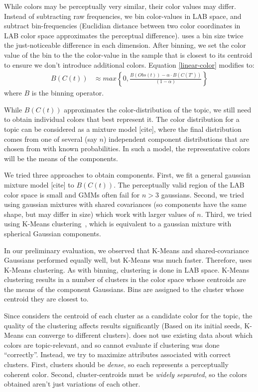 While colors may be perceptually very similar, their color values may differ. Instead of subtracting raw frequencies, we bin color-values in LAB space, and subtract bin-frequencies (Euclidian distance between two color coordinates in LAB color space approximates the perceptual difference). \system uses a bin size twice the just-noticeable difference in each dimension. After binning, we set the color value of the bin to the the color-value in the sample that is closest to its centroid to ensure we don't introduce additional colors. Equation \ref{linear-color} modifies to:
\begin{align}
\label{linear-color-bin}  
B(C(t)) &\approx max\left\{0,\frac{B(Obs(t)) - \alpha \cdot B(C(T'))}{(1-\alpha)}\right\}
\end{align}
where $B$ is the binning operator.

While $B(C(t))$ approximates the color-distribution of the topic, we still need to obtain individual colors that best represent it. The color distribution for a topic can be considered as a mixture model [cite], where the final distribution comes from one of several (say $n$) independent component distributions that are chosen from with known probabilities. In such a model, the representative colors will be the means of the components. 

We tried three approaches to obtain components. First, we fit a general gaussian mixture model [cite] to $B(C(t))$. The perceptually valid region of the LAB color space is small and GMMs often fail for $n>3$ gaussians. Second, we tried using gaussian mixtures with shared covariances (so components have the same shape, but may differ in size) which work with larger values of $n$. Third, we tried using K-Means clustering~\cite{kmeans}, which is equivalent to a gaussian mixture with spherical Gaussian components. 

In our preliminary evaluation, we observed that K-Means and shared-covariance Gaussians performed equally well, but K-Means was much faster. Therefore, \system uses K-Means clustering. As with binning, clustering is done in LAB space. K-Means clustering results in a number of clusters in the color space whose centroids are the means of the component Gaussians. Bins are assigned to the cluster whose centroid they are closest to. 

Since \system considers the centroid of each cluster as a candidate color for the topic, the quality of the clustering affects results significantly (Based on its initial seeds, K-Means can converge to different clusters). \system does not use existing data about which colors are topic-relevant, and so cannot evaluate if clustering was done ``correctly''. Instead, we try to maximize attributes associated with correct clusters. First, clusters should be \textit{dense}, so each represents a perceptually coherent color. Second, cluster-centroids must be \textit{widely separated}, so the colors obtained aren't just variations of each other. 

